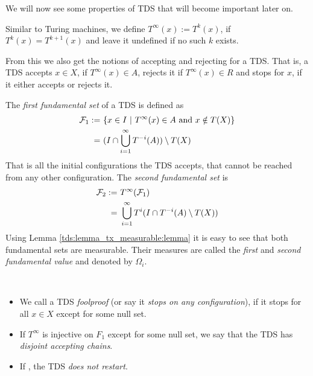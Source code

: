We will now see some properties of TDS that will become important later on.

Similar to Turing machines, we define $T^\infty(x):=T^k(x)$, if $T^k(x)=T^{k+1}(x)$ and leave it undefined if no such $k$ exists.

From this we also get the notions of accepting and rejecting for a TDS.
That is, a TDS accepts $x \in X$, if $T^\infty(x) \in A$,
rejects it if $T^\infty(x) \in R$ 
and stops for $x$, if it either accepts or rejects it.

\begin{Definition}
	The \emph{first fundamental set} of a TDS is defined as
	\begin{align*}
		\mathcal{F}_1 :=&~\{ x \in I~|~T^\infty(x) \in A~\text{and}~x \notin T(X) \} \\
		=&~(I \cap \bigcup_{i=1}^\infty T^{-i}(A)) \setminus T(X)
	\end{align*}
	That is all the initial configurations the TDS accepts, that cannot be reached from any other configuration.
	The \emph{second fundamental set} is
	\begin{align*}
		\mathcal{F}_2 :=&~T^\infty(\mathcal{F}_1) \\
		=&~\bigcup_{i=1}^\infty T^i( I \cap T^{-i}(A) \setminus T(X))
	\end{align*}
	Using Lemma \ref{tds:lemma_tx_measurable:lemma} it is easy to see that both fundamental sets are measurable.
	Their measures are called the \emph{first} and \emph{second fundamental value} and denoted by $\Omega_i$.
\end{Definition}

\begin{Definition}
	\
	\begin{itemize}
		\item We call a TDS \emph{foolproof} (or say it \emph{stops on any configuration}), if it stops for all $x \in X$ except for some null set.

		\item If $T^\infty$ is injective on $F_1$ except for some null set, we say that the TDS has \emph{disjoint accepting chains}.

		\item If , the TDS \emph{does not restart}.
	\end{itemize}
\end{Definition}
